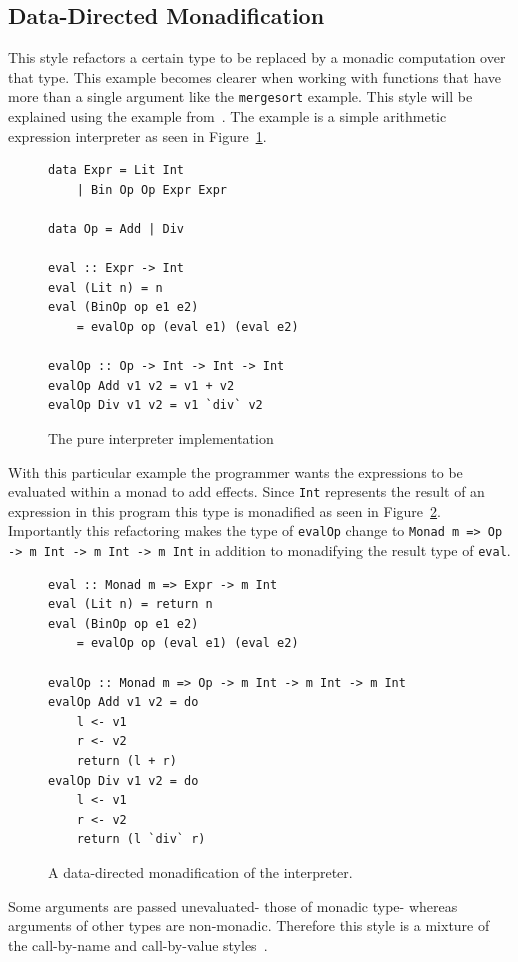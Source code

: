 \subsection{Data-Directed Monadification}
This style refactors a certain type to be replaced by a monadic computation over that type. This example becomes clearer when working with functions that have more than a single argument like the \texttt{mergesort} example. This style will be explained using the example from~\cite{lammelReuse}. The example is a simple arithmetic expression interpreter as seen in Figure~\ref{fig:interpreter}.

\begin{figure}[t]
\begin{lstlisting}
data Expr = Lit Int
	| Bin Op Op Expr Expr

data Op = Add | Div

eval :: Expr -> Int
eval (Lit n) = n
eval (BinOp op e1 e2)
	= evalOp op (eval e1) (eval e2)
	
evalOp :: Op -> Int -> Int -> Int
evalOp Add v1 v2 = v1 + v2
evalOp Div v1 v2 = v1 `div` v2
\end{lstlisting}
\caption{The pure interpreter implementation}
\label{fig:interpreter}
\end{figure}

With this particular example the programmer wants the expressions to be evaluated within a monad to add effects. Since \texttt{Int} represents the result of an expression in this program this type is monadified as seen in Figure~\ref{fig:monInterp}. Importantly this refactoring makes the type of \texttt{evalOp} change to \texttt{Monad m => Op -> m Int -> m Int -> m Int} in addition to monadifying the result type of \texttt{eval}. 

\begin{figure}[t]
\begin{lstlisting}
eval :: Monad m => Expr -> m Int
eval (Lit n) = return n
eval (BinOp op e1 e2)
	= evalOp op (eval e1) (eval e2)
	
evalOp :: Monad m => Op -> m Int -> m Int -> m Int
evalOp Add v1 v2 = do 
	l <- v1
	r <- v2	
	return (l + r)
evalOp Div v1 v2 = do
	l <- v1
	r <- v2
	return (l `div` r)
\end{lstlisting}
\caption{A data-directed monadification of the interpreter.}
\label{fig:monInterp}
\end{figure}

Some arguments are passed unevaluated- those of monadic type- whereas arguments of other types are non-monadic. Therefore this style is a mixture of the call-by-name and call-by-value styles~\citep{monadSurvey}. 

